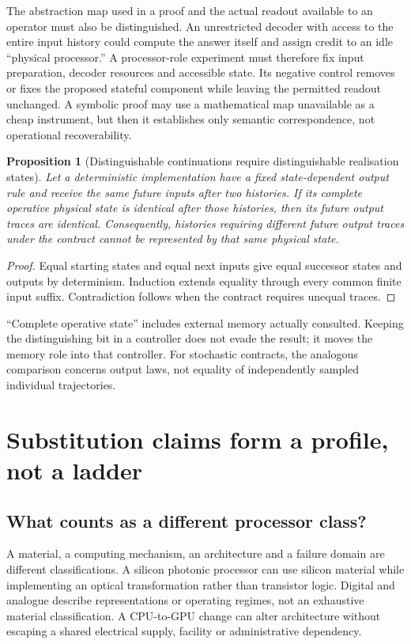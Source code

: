 \documentclass[11pt,a4paper]{article}
\newtheorem{proposition}[theorem]{Proposition}
\theoremstyle{definition}
\theoremstyle{remark}
\begin{document}
The abstraction map used in a proof and the actual readout available to an operator must also be distinguished. An unrestricted decoder with access to the entire input history could compute the answer itself and assign credit to an idle ``physical processor.'' A processor-role experiment must therefore fix input preparation, decoder resources and accessible state. Its negative control removes or fixes the proposed stateful component while leaving the permitted readout unchanged. A symbolic proof may use a mathematical map unavailable as a cheap instrument, but then it establishes only semantic correspondence, not operational recoverability.

\begin{proposition}[Distinguishable continuations require distinguishable realisation states]\label{prop:memorynecessity}
Let a deterministic implementation have a fixed state-dependent output rule and receive the same future inputs after two histories. If its complete operative physical state is identical after those histories, then its future output traces are identical. Consequently, histories requiring different future output traces under the contract cannot be represented by that same physical state.
\end{proposition}
\begin{proof}
Equal starting states and equal next inputs give equal successor states and outputs by determinism. Induction extends equality through every common finite input suffix. Contradiction follows when the contract requires unequal traces.
\end{proof}
``Complete operative state'' includes external memory actually consulted. Keeping the distinguishing bit in a controller does not evade the result; it moves the memory role into that controller. For stochastic contracts, the analogous comparison concerns output laws, not equality of independently sampled individual trajectories.


\section{Substitution claims form a profile, not a ladder}\label{sec:substitution}
\subsection{What counts as a different processor class?}
A material, a computing mechanism, an architecture and a failure domain are different classifications. A silicon photonic processor can use silicon material while implementing an optical transformation rather than transistor logic. Digital and analogue describe representations or operating regimes, not an exhaustive material classification. A CPU-to-GPU change can alter architecture without escaping a shared electrical supply, facility or administrative dependency.
\end{document}
